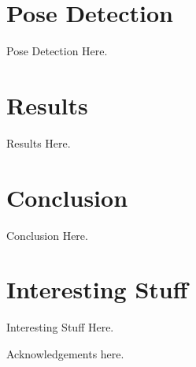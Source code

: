 \documentclass{acmtog}
\begin{document}
\section{Pose Detection}
\label{sec:realtimeposedetection}

Pose Detection Here.

\section{Results}
\label{sec:results}

Results Here.

\section{Conclusion}
\label{sec:conclusion}

Conclusion Here.

\appendix

\section{Interesting Stuff}

Interesting Stuff Here.

\begin{acks}

Acknowledgements here.

\end{acks}




\end{document}
